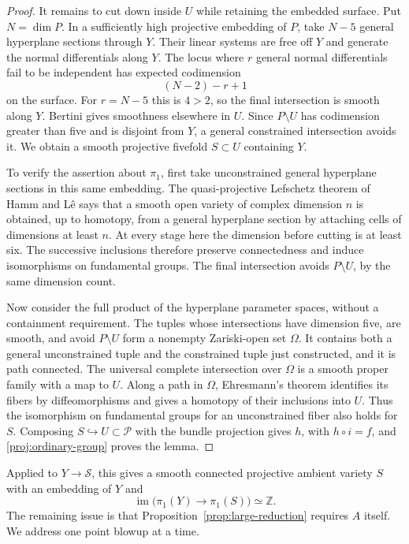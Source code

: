 \documentclass[11pt,reqno]{amsart}
\numberwithin{equation}{section}
\theoremstyle{definition}
\theoremstyle{remark}
\begin{document}
\begin{proof}
It remains to cut down inside $U$ while retaining the embedded surface.
Put $N=\dim P$.  In a sufficiently high projective embedding of $P$,
take $N-5$ general hyperplane sections through $Y$.  Their linear systems
are free off $Y$ and generate the normal differentials along $Y$.
The locus where $r$ general normal differentials fail to be independent
has expected codimension
\begin{equation}\label{proj:rank-loss}
 (N-2)-r+1
\end{equation}
on the surface.  For $r=N-5$ this is $4>2$, so the final intersection
is smooth along $Y$.  Bertini gives smoothness elsewhere in $U$.
Since $P\setminus U$ has codimension greater than five and is disjoint
from $Y$, a general constrained intersection avoids it.  We obtain a
smooth projective fivefold $S\subset U$ containing $Y$.

To verify the assertion about $\pi_1$, first take unconstrained general
hyperplane sections in this same embedding.  The quasi-projective
Lefschetz theorem of Hamm and L\^e
\cite[Theorem~1.1.3(ii)]{HammLe} says that a smooth open variety of
complex dimension $n$ is obtained, up to homotopy, from a general
hyperplane section by attaching cells of dimensions at least $n$.
At every stage here the dimension before cutting is at least six.
The successive inclusions therefore preserve connectedness and induce
isomorphisms on fundamental groups.  The final intersection avoids
$P\setminus U$, by the same dimension count.

Now consider the full product of the hyperplane parameter spaces,
without a containment requirement.  The tuples whose intersections
have dimension five, are smooth, and avoid $P\setminus U$ form a
nonempty Zariski-open set $\Omega$.  It contains both a general
unconstrained tuple and the constrained tuple just constructed, and it
is path connected.  The universal complete intersection over $\Omega$
is a smooth proper family with a map to $U$.  Along a path in $\Omega$,
Ehresmann's theorem identifies its fibers by diffeomorphisms and gives
a homotopy of their inclusions into $U$.  Thus the isomorphism on
fundamental groups for an unconstrained fiber also holds for $S$.
Composing $S\hookrightarrow U\subset\mathcal P$ with the bundle
projection gives $h$, with $h\circ i=f$, and
\eqref{proj:ordinary-group} proves the lemma.
\end{proof}

Applied to $Y\to\mathcal S$, this gives a smooth connected projective ambient
variety $S$ with an embedding of $Y$ and
\begin{equation}\label{proj:blownup-image}
 \operatorname{im}\bigl(\pi_1(Y)\longrightarrow\pi_1(S)\bigr)\simeq\mathbb Z.
\end{equation}
The remaining issue is that Proposition~\ref{prop:large-reduction}
requires $A$ itself.  We address one point blowup at a time.
\end{document}
